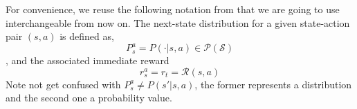 
For convenience, we reuse the following notation from \cite{castro2021mico} that we are going to use interchangeable from now on. The next-state distribution for a given state-action pair $(s, a)$ is defined as,
$$P^a_s = P(\cdot|s, a) \in \mathcal{P(S)}$$, and the associated immediate reward 
$$r^a_s = r_t = \mathcal{R}(s,a)$$ 
Note not get confused with $P^a_s \neq P(s'|s, a)$, the former represents a distribution and the second one a probability value.






